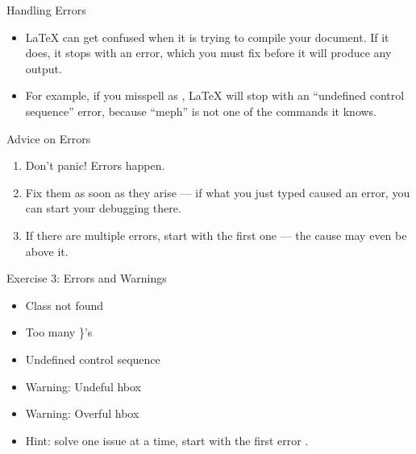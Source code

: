 \documentclass[10pt,times]{beamer}
\begin{document}

\begin{frame}{Handling Errors}
\begin{itemize}
\item \LaTeX{} can get confused when it is trying to compile your document. If
it does, it stops with an error, which you must fix before it will produce
any output.
\item For example, if you misspell  as , \LaTeX{} will
stop with an ``undefined control sequence'' error, because ``meph'' is not
one of the commands it knows.
\end{itemize}
\begin{block}{Advice on Errors}
\begin{enumerate}
\item Don't panic! Errors happen.
\item Fix them as soon as they arise --- if what you just typed caused an error,
you can start your debugging there.
\item If there are multiple errors, start with the first one --- the cause may
even be above it.
\end{enumerate}
\end{block}
\end{frame}

\begin{frame}{Exercise 3: Errors and Warnings}
\begin{itemize}
\item Class not found
\item Too many \}'s
\item Undefined control sequence
\item Warning: Undeful hbox
\item Warning: Overful hbox
\end{itemize}
\begin{center}
\end{center}

\begin{itemize}
\item Hint: solve one issue at a time, start with the first error
.
\end{itemize}

\end{frame}
\end{document}
